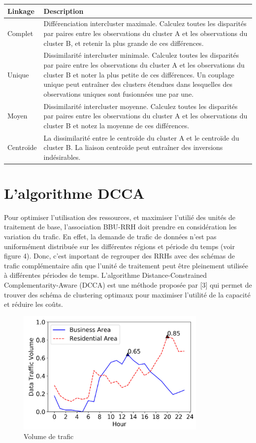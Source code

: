 \documentclass{report}
\begin{document}
\begin{tabularx}{\linewidth}{|x|X|}
   \hline
  Linkage & Description  \\
  \hline
  Complet & Différenciation intercluster maximale. Calculez toutes les disparités par paires entre les observations du cluster A et les observations du cluster B, et retenir la plus grande de ces différences. \\
  \hline
  Unique & Dissimilarité intercluster minimale. Calculez toutes les disparités par paire entre les observations du cluster A et les observations du cluster B et noter la plus petite de ces différences. Un couplage unique peut entraîner des clusters étendues dans lesquelles des observations uniques sont fusionnées une par une. \\
  \hline
  Moyen & Dissimilarité intercluster moyenne. Calculez toutes les disparités par paires entre les observations du cluster A et les observations du cluster B et notez la moyenne de ces différences. \\
  \hline
  Centroïde & La dissimilarité entre le centroïde du cluster A et le centroïde du cluster B. La liaison centroïde peut entraîner des inversions indésirables. \\
  \hline
\end{tabularx}

\section{L'algorithme DCCA}
\paragraph{}
Pour optimiser l'utilisation des ressources, et maximiser l'utilié des unités de traitement de base, l'association BBU-RRH doit prendre 
en considération les variation du trafic. En effet, la demande de trafic de données n'est pas uniformément distribuée sur les différentes régions et période du temps (voir figure 4).
Donc, c'est important de regrouper des RRHs avec des schémas de trafic complémentaire afin que l'unité de traitement peut être pleinement 
utilisée à différentes périodes de temps. L'algorithme Distance-Constrained Complementarity-Aware (DCCA) est une méthode proposée par [3]
qui permet de trouver des schéma de clustering optimaux pour maximiser l'utilité de la capacité et réduire les coûts.

\begin{figure}[h]
  \centering
  \includegraphics[width=25em]{images/trafic.png}
  \caption{Volume de trafic}
\end{figure} \\
\end{document}
